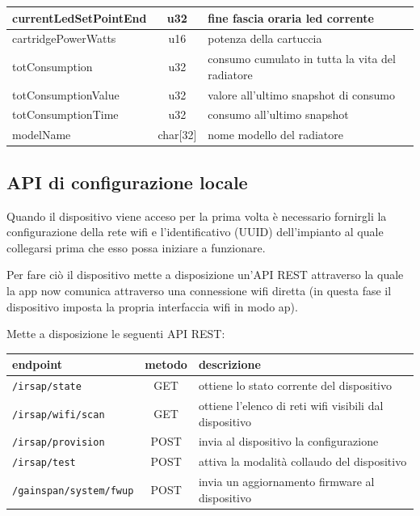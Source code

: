 \documentclass[12pt,a4paper,twoside,titlepage]{book}
\begin{document}
\begin{center}
\begin{longtable}{| p{5cm} | c | p{8cm} |}
    currentLedSetPointEnd & u32 & fine fascia oraria \acrshort{led} corrente\\ \hline
    cartridgePowerWatts & u16 & potenza della cartuccia\\ \hline
    totConsumption & u32 & consumo cumulato in tutta la vita del radiatore\\ \hline
    totConsumptionValue & u32 & valore all’ultimo snapshot di consumo\\ \hline
    totConsumptionTime & u32 & consumo all’ultimo snapshot\\ \hline
    modelName & char[32] & nome modello del radiatore\\ \hline
\end{longtable}
\end{center}

\subsection{API di configurazione locale}

Quando il dispositivo viene acceso per la prima volta è necessario fornirgli la
configurazione della rete \Gls{wifi} e l'identificativo (UUID) dell'impianto al quale
collegarsi prima che esso possa iniziare a funzionare.

Per fare ciò il dispositivo mette a disposizione un'API REST attraverso la quale la
app \Gls{now} comunica attraverso una connessione \Gls{wifi} diretta (in questa fase
il dispositivo imposta la propria interfaccia \Gls{wifi} in modo \acrshort{ap}).

Mette a disposizione le seguenti API REST:

\begin{center}
\begin{tabular}{| l | c | p{6cm} |}
    \hline 
    \textbf{endpoint} & \textbf{metodo} & \textbf{descrizione} \\ \hline 
    \texttt{/irsap/state} & GET & ottiene lo stato corrente del dispositivo \\ \hline 
    \texttt{/irsap/wifi/scan} & GET & ottiene l'elenco di reti \Gls{wifi} visibili dal dispositivo \\ \hline 
    \texttt{/irsap/provision} & POST & invia al dispositivo la configurazione \\ \hline 
    \texttt{/irsap/test} & POST & attiva la modalità collaudo del dispositivo \\ \hline 
    \texttt{/gainspan/system/fwup} & POST & invia un aggiornamento \gls{firmware} al dispositivo \\ \hline
\end{tabular}
\end{center}
\end{document}
